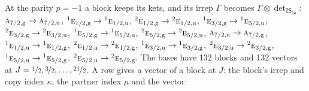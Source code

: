 \documentclass[10pt,a4paper]{article}
\numberwithin{equation}{section}
\newcommand{\grp}[1]{\mathsf{#1}}
\newcommand{\irr}[1]{\text{\normalfont\scshape #1}}
\newcommand{\conjpair}[1]{{}^{#1}}
\newcommand{\ptag}[1]{\mathrm{#1}}
\newcommand{\irrprod}{\otimes}
\newcommand{\mult}{\kappa}
\newcommand{\intx}{\mu}
\begin{document}
At the parity $p = -1$ a block keeps its kets, and its irrep $\Gamma$ becomes $\Gamma \irrprod \det_{\grp{2S_{14}}}$: $\irr{a}_{7/2,\ptag{g}} \to \irr{a}_{7/2,\ptag{u}}$, $\conjpair{1}\irr{e}_{1/2,\ptag{g}} \to \conjpair{1}\irr{e}_{1/2,\ptag{u}}$, $\conjpair{2}\irr{e}_{1/2,\ptag{g}} \to \conjpair{2}\irr{e}_{1/2,\ptag{u}}$, $\conjpair{1}\irr{e}_{3/2,\ptag{g}} \to \conjpair{1}\irr{e}_{3/2,\ptag{u}}$, $\conjpair{2}\irr{e}_{3/2,\ptag{g}} \to \conjpair{2}\irr{e}_{3/2,\ptag{u}}$, $\conjpair{1}\irr{e}_{5/2,\ptag{g}} \to \conjpair{1}\irr{e}_{5/2,\ptag{u}}$, $\conjpair{2}\irr{e}_{5/2,\ptag{g}} \to \conjpair{2}\irr{e}_{5/2,\ptag{u}}$, $\irr{a}_{7/2,\ptag{u}} \to \irr{a}_{7/2,\ptag{g}}$, $\conjpair{1}\irr{e}_{1/2,\ptag{u}} \to \conjpair{1}\irr{e}_{1/2,\ptag{g}}$, $\conjpair{2}\irr{e}_{1/2,\ptag{u}} \to \conjpair{2}\irr{e}_{1/2,\ptag{g}}$, $\conjpair{1}\irr{e}_{3/2,\ptag{u}} \to \conjpair{1}\irr{e}_{3/2,\ptag{g}}$, $\conjpair{2}\irr{e}_{3/2,\ptag{u}} \to \conjpair{2}\irr{e}_{3/2,\ptag{g}}$, $\conjpair{1}\irr{e}_{5/2,\ptag{u}} \to \conjpair{1}\irr{e}_{5/2,\ptag{g}}$, $\conjpair{2}\irr{e}_{5/2,\ptag{u}} \to \conjpair{2}\irr{e}_{5/2,\ptag{g}}$.
The bases have 132 blocks and 132 vectors at $J = \nicefrac{1}{2}, \nicefrac{3}{2}, \dots, \nicefrac{21}{2}$. \label{n:index.copy}\label{n:head.vector}A row gives a vector of a block at $J$: the block's irrep and copy index $\mult$, the partner index $\intx$ and the vector.
\end{document}
